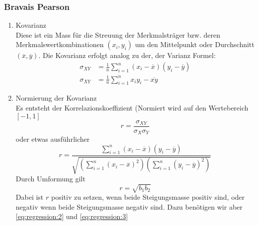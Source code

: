 \subsubsection{Bravais Pearson}
\begin{enumerate}[label=\bfseries \arabic*. Schritt: ]
\item Kovarianz\\
Diese ist ein Mass für die Streuung der Merkmalsträger bzw. deren Merkmalswertkombinationen $(x_i, y_i)$ um den Mittelpunkt oder Durchschnitt $(\overline{x}, \overline{y})$. Die Kovarianz erfolgt analog zu der, der Varianz
Formel:
\begin{align}
\sigma_{XY}&=\frac{1}{n}\sum_{i=1}^n (x_i-\overline{x})(y_i-\overline{y})\label{eq:regression:2}\\
\sigma_{XY}&=\frac{1}{n}\sum_{i=1}^n x_i y_i - \overline{xy}\label{eq:regression:3}
\end{align}
\item Normierung der Kovarianz\\
Es entsteht der Korrelazionskoeffizient (Normiert wird auf den Wertebereich $[-1,1]$
\begin{equation}
r=\frac{\sigma_{XY}}{\sigma_X\sigma_Y}
\end{equation}
oder etwas ausführlicher
\begin{equation}
r=\frac{\sum_{i=1}^n(x_i-\overline{x})(y_i-\overline{y})}{\sqrt{(\sum_{i=1}^n(x_i-\overline{x})^2)(\sum_{i=1}^n (y_i-\overline{y})^2)}}
\end{equation}
Durch Umformung gilt
\begin{equation}
r=\sqrt{b_1 b_2}
\end{equation}
Dabei ist $r$ positiv zu setzen, wenn beide Steigungsmasse positiv sind, oder negativ wenn beide Steigungsmasse negativ sind. Dazu benötigen wir aber \autoref{eq:regression:2} und \autoref{eq:regression:3}
\end{enumerate}
